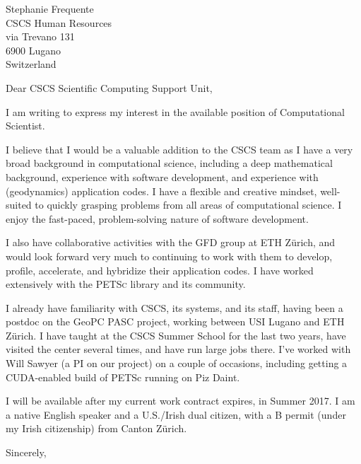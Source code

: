 \documentclass{letter}
\begin{document}
\begin{letter}{Stephanie Frequente\\CSCS Human Resources\\via Trevano 131\\6900 Lugano\\Switzerland}
\opening{Dear CSCS Scientific Computing Support Unit,}
I am writing to express my interest in the available position of Computational Scientist.

  I believe that I would be a valuable addition to the CSCS team as I have a very broad background in computational science, including a deep mathematical background, experience with software development, and experience with (geodynamics) application codes. I have a flexible and creative mindset, well-suited to quickly grasping problems from all areas of computational science. I enjoy the fast-paced, problem-solving nature of software development.

  I also have collaborative activities with the GFD group at ETH Zürich, and would look forward very much to continuing to work with them to develop, profile, accelerate, and hybridize their application codes. I have worked extensively with the \textsc{PETSc} library and its community.

  I already have familiarity with CSCS, its systems, and its staff, having been a postdoc on the GeoPC PASC project, working between USI Lugano and ETH Z\"{u}rich. I have taught at the CSCS Summer School for the last two years, have visited the center several times, and have run large jobs there. I've worked with Will Sawyer (a PI on our project) on a couple of occasions, including getting a CUDA-enabled build of PETSc running on Piz Daint. 

  I will be available after my current work contract expires, in Summer 2017. I am a native English speaker and a U.S./Irish dual citizen, with a B permit (under my Irish citizenship) from Canton Z\"{u}rich.
\closing{Sincerely,}
\end{letter}
\end{document}
